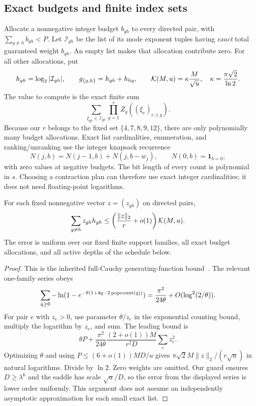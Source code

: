 \subsection{Exact budgets and finite index sets}
Allocate a nonnegative integer budget $b_{gh}$ to every directed pair,
with $\sum_{g\ne h}b_{gh}<P$. Let $\mathcal I_{gh}$ be the list of its mode
exponent tuples having \emph{exact} total guaranteed weight $b_{gh}$.
An empty list makes that allocation contribute zero. For all other allocations,
put
\[
 h_{gh}=\log_2|\mathcal I_{gh}|,\qquad
 g_{\{g,h\}}=h_{gh}+h_{hg},\qquad
 \mathcal K(M,u)=\kappa\frac M{\sqrt u},\quad
 \kappa=\frac{\pi\sqrt2}{\ln2}.
\]
The value to compute is the exact finite sum
\begin{equation}
 \sum_{\xi_{gh}\in\mathcal I_{gh}}
       \prod_{g=1}^r Z_g((\xi_e)_{e\ni g}).\label{eq:graphsum}
\end{equation}
Because our $r$ belongs to the fixed set $\{4,7,8,9,12\}$, there are only
polynomially many budget allocations. Exact list cardinalities, enumeration,
and ranking/unranking use the integer knapsack recurrence
\[
 N(j,b)=N(j-1,b)+N(j,b-w_j),\qquad N(0,b)=\mathbf1_{b=0},
\]
with zero values at negative budgets. The bit length of every count is
polynomial in $s$. Choosing a contraction plan can therefore use exact
integer cardinalities; it does not need floating-point logarithms.

\begin{lemma}\label{lem:entropy}
For each fixed nonnegative vector $z=(z_{gh})$ on directed pairs,
\begin{equation}
 \sum_{g\ne h}z_{gh}h_{gh}
 \le \left(\frac{\|z\|_2}{r}+o(1)\right)\mathcal K(M,u).
 \label{eq:entropy}
\end{equation}
The error is uniform over our fixed finite support families, all exact
budget allocations, and all active depths of the schedule below.
\end{lemma}
\begin{proof}
This is the inherited full-Cauchy generating-function bound~\cite{joint,tree}.
The relevant one-family series obeys
\[
 \sum_{q\ge0}-\ln(1-e^{-\theta(1+4q-2\operatorname{popcount}(q))})
  =\frac{\pi^2}{24\theta}+O(\log^2(2/\theta)).
\]
For pair $e$ with $z_e>0$, use parameter $\theta/z_e$ in the exponential
counting bound, multiply the logarithm by $z_e$, and sum. The leading bound is
\[
 \theta P+\frac{\pi^2}{24\theta}
          \frac{(2+o(1))M}{r^2D}\sum_ez_e^2.
\]
Optimizing $\theta$ and using $P\le(6+o(1))MD/u$ gives
$\pi\sqrt2 M\|z\|_2/(r\sqrt u)$ in natural logarithms.
Divide by $\ln2$. Zero weights are omitted. Our guard ensures
$D\ge\lambda^6$ and the saddle has scale $\sqrt u/D$, so the error from
the displayed series is lower order uniformly. This argument does not assume
an independently asymptotic approximation for each small exact list.
\end{proof}

